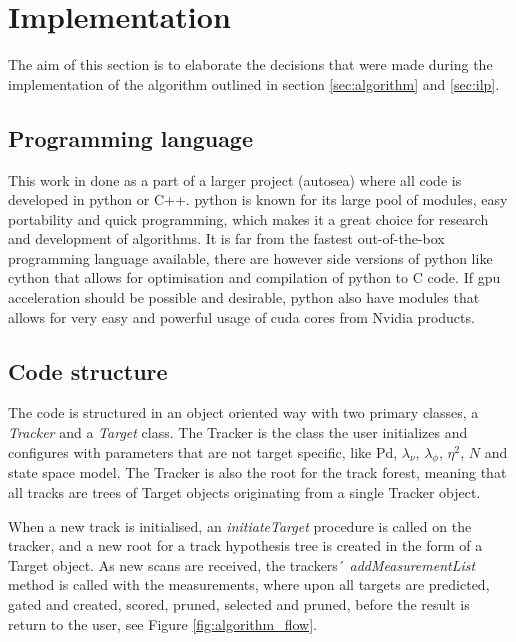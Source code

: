 \section{Implementation}
\label{sec:implementation}
The aim of this section is to elaborate the decisions that were made during the implementation of the algorithm outlined in section \ref{sec:algorithm} and \ref{sec:ilp}.

\subsection{Programming language}
This work in done as a part of a larger project (\gls{autosea}) where all code is developed in \gls{python} or C++. \Gls{python} is known for its large pool of modules, easy portability and quick programming, which makes it a great choice for research and development of algorithms. It is far from the fastest out-of-the-box programming language available, there are however side versions of python like \gls{cython} that allows for optimisation and compilation of \gls{python} to C code. If \gls{gpu} acceleration should be possible and desirable, \gls{python} also have modules that allows for very easy and powerful usage of \gls{cuda} cores from Nvidia products.


\subsection{Code structure}
The code is structured in an object oriented way with two primary classes, a \emph{Tracker} and a \emph{Target} class. The Tracker is the class the user initializes and configures with parameters that are not target specific, like \gls{Pd}, $\lambda_\nu$, $\lambda_\phi$, $\eta^2$, $N$ and state space model. The Tracker is also the root for the track forest, meaning that all tracks are trees of Target objects originating from a single Tracker object.

When a new track is initialised, an \emph{initiateTarget} procedure is called on the tracker, and a new root for a \gls{track hypothesis tree} is created in the form of a Target object. As new \glspl{scan} are received, the trackers´ \emph{addMeasurementList} method is called with the measurements, where upon all \glspl{target} are predicted, gated and created, scored, pruned, selected and pruned, before the result is return to the user, see Figure \ref{fig:algorithm_flow}.

